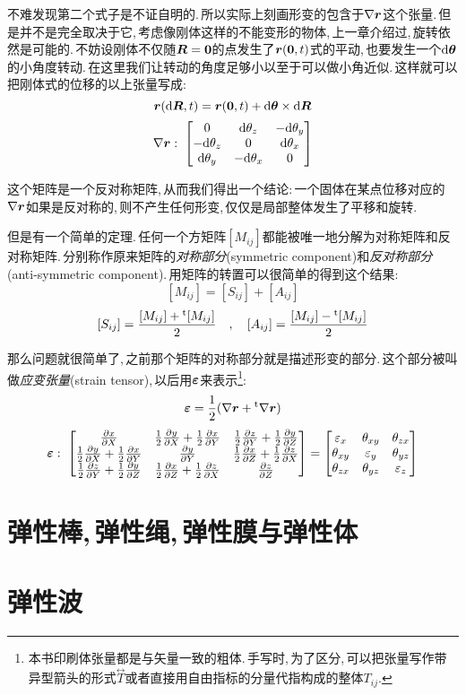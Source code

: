 不难发现第二个式子是不证自明的.\,所以实际上刻画形变的包含于$\nabla\boldsymbol{r}$这个张量.\,但是并不是完全取决于它,\,考虑像刚体这样的不能变形的物体,\,上一章介绍过,\,旋转依然是可能的.\,不妨设刚体不仅随$\boldsymbol{R}=\boldsymbol{0}$的点发生了$\boldsymbol{r}(\boldsymbol{0},t)$式的平动,\,也要发生一个$\textrm{d}\boldsymbol{\theta}$的小角度转动.\,在这里我们让转动的角度足够小以至于可以做小角近似.\,这样就可以把刚体式的位移的以上张量写成:
\[\boldsymbol{r}(\textrm{d} \boldsymbol{R},t)=\boldsymbol{r}(\boldsymbol{0},t)+\textrm{d} \boldsymbol{\theta}\times \textrm{d} \boldsymbol{R}\]
\[\nabla\boldsymbol{r}:\; \begin{bmatrix} 0&\textrm{d} \theta_z &-\textrm{d} \theta_y \\-\textrm{d} \theta_z&0&\textrm{d} \theta_x \\ \textrm{d} \theta_y &-\textrm{d} \theta_x &0\end{bmatrix}\]

这个矩阵是一个反对称矩阵,\,从而我们得出一个结论:\,一个固体在某点位移对应的$\nabla\boldsymbol{r}$如果是反对称的,\,则不产生任何形变,\,仅仅是局部整体发生了平移和旋转.

但是有一个简单的定理.\,任何一个方矩阵$[M_{ij}]$都能被唯一地分解为对称矩阵和反对称矩阵.\,分别称作原来矩阵的\emph{对称部分}(symmetric component)和\emph{反对称部分}(anti-symmetric component).\,用矩阵的转置可以很简单的得到这个结果:
\[[M_{ij}]=[S_{ij}]+[A_{ij}]\]
\[[S_{ij}]=\frac{[M_{ij}]+\phantom{}^{\rm t}[M_{ij}]}{2}\quad,\quad [A_{ij}]=\frac{[M_{ij}]-\phantom{}^{\rm t}[M_{ij}]}{2}\]

那么问题就很简单了,\,之前那个矩阵的对称部分就是描述形变的部分.\,这个部分被叫做\emph{应变张量}(strain tensor),\,以后用$\boldsymbol{\varepsilon}$来表示\footnote{本书印刷体张量都是与矢量一致的粗体.\,手写时,\,为了区分,\,可以把张量写作带异型箭头的形式$\stackrel{\leftrightarrow}{T}$或者直接用自由指标的分量代指构成的整体$T_{ij}$.}:
\[\boldsymbol{\varepsilon}=\frac{1}{2}(\nabla\boldsymbol{r}+\phantom{}^{\rm t}\nabla\boldsymbol{r})\]
\[\boldsymbol{\varepsilon}:\; \begin{bmatrix}\frac{\partial x}{\partial X}&\frac{1}{2}\frac{\partial y}{\partial X}+\frac{1}{2}\frac{\partial x}{\partial Y}&\frac{1}{2}\frac{\partial z}{\partial Y}+\frac{1}{2}\frac{\partial y}{\partial Z}\\\frac{1}{2}\frac{\partial y}{\partial X}+\frac{1}{2}\frac{\partial x}{\partial Y}&\frac{\partial y}{\partial Y}&\frac{1}{2}\frac{\partial x}{\partial Z}+\frac{1}{2}\frac{\partial z}{\partial X}\\\frac{1}{2}\frac{\partial z}{\partial Y}+\frac{1}{2}\frac{\partial y}{\partial Z}&\frac{1}{2}\frac{\partial x}{\partial Z}+\frac{1}{2}\frac{\partial z}{\partial X}&\frac{\partial z}{\partial Z}\end{bmatrix}=\begin{bmatrix} \varepsilon_x&\theta_{xy} &\theta_{zx} \\ \theta_{xy}&\varepsilon_y&\theta_{yz} \\ \theta_{zx}&\theta_{yz}&\varepsilon_z\end{bmatrix}\]


\section{弹性棒,\,弹性绳,\,弹性膜与弹性体}

\section{弹性波}


